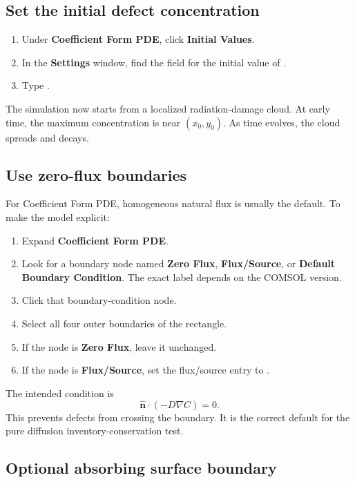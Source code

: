 \documentclass[11pt]{article}
\newcommand{\code}[1]{\texttt{\detokenize{#1}}}
\begin{document}
\subsection{Set the initial defect concentration}

\begin{enumerate}[leftmargin=2em]
\item Under \textbf{Coefficient Form PDE}, click \textbf{Initial Values}.
\item In the \textbf{Settings} window, find the field for the initial value of \code{C}.
\item Type \code{Cinit}.
\end{enumerate}

The simulation now starts from a localized radiation-damage cloud. At early time, the maximum concentration is near $(x_0,y_0)$. As time evolves, the cloud spreads and decays.

\subsection{Use zero-flux boundaries}

For Coefficient Form PDE, homogeneous natural flux is usually the default. To make the model explicit:

\begin{enumerate}[leftmargin=2em]
\item Expand \textbf{Coefficient Form PDE}.
\item Look for a boundary node named \textbf{Zero Flux}, \textbf{Flux/Source}, or \textbf{Default Boundary Condition}. The exact label depends on the COMSOL version.
\item Click that boundary-condition node.
\item Select all four outer boundaries of the rectangle.
\item If the node is \textbf{Zero Flux}, leave it unchanged.
\item If the node is \textbf{Flux/Source}, set the flux/source entry to \code{0}.
\end{enumerate}

The intended condition is
\begin{equation}
\hat{\mathbf n}\cdot(-D\nabla C)=0.
\end{equation}
This prevents defects from crossing the boundary. It is the correct default for the pure diffusion inventory-conservation test.

\subsection{Optional absorbing surface boundary}
\end{document}
